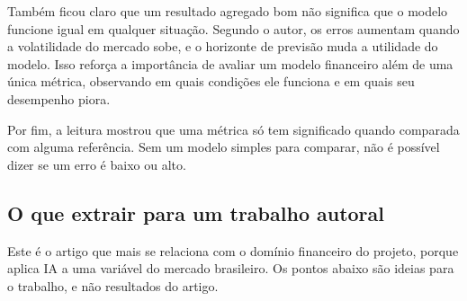 Também ficou claro que um resultado agregado bom não significa que o modelo funcione igual em qualquer situação. Segundo o autor, os erros aumentam quando a volatilidade do mercado sobe, e o horizonte de previsão muda a utilidade do modelo. Isso reforça a importância de avaliar um modelo financeiro além de uma única métrica, observando em quais condições ele funciona e em quais seu desempenho piora.

Por fim, a leitura mostrou que uma métrica só tem significado quando comparada com alguma referência. Sem um modelo simples para comparar, não é possível dizer se um erro é baixo ou alto.

\subsection*{O que extrair para um trabalho autoral}

Este é o artigo que mais se relaciona com o domínio financeiro do projeto, porque aplica IA a uma variável do mercado brasileiro. Os pontos abaixo são ideias para o trabalho, e não resultados do artigo.

